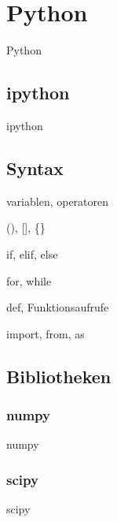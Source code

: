 \section{Python}
  \begin{frame}{Python}
    \tableofcontents[sectionstyle=show/hide,
                     subsectionstyle=show/show/hide,
                     subsubsectionstyle=show/show/show]
  \end{frame}

  \subsection{ipython}
    \begin{frame}{ipython}
    \end{frame}

  \subsection{Syntax}
    \begin{frame}{variablen, operatoren}
    \end{frame}

    \begin{frame}{(), [], \{\}}
    \end{frame}

    \begin{frame}{if, elif, else}
    \end{frame}

    \begin{frame}{for, while}
    \end{frame}

    \begin{frame}{def, Funktionsaufrufe}
    \end{frame}

    \begin{frame}{import, from, as}
    \end{frame}

  \subsection{Bibliotheken}
    \subsubsection{numpy}
      \begin{frame}{numpy}
      \end{frame}

    \subsubsection{scipy}
      \begin{frame}{scipy}
      \end{frame}

